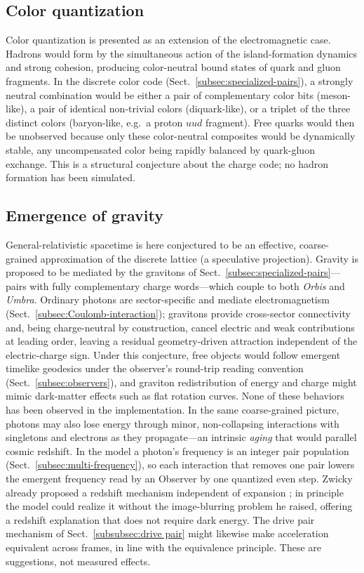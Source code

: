 \documentclass{ijuc}
\begin{document}
\subsection{Color quantization}
Color quantization is presented as an extension of the electromagnetic case.
Hadrons would form by the simultaneous action of the island-formation dynamics and strong cohesion, producing color-neutral bound states of quark and gluon fragments. In the discrete color code (Sect.~\ref{subsec:specialized-pairs}), a strongly neutral combination would be either a pair of complementary color bits (meson-like), a pair of identical non-trivial colors (diquark-like), or a triplet of the three distinct colors (baryon-like, e.g.\ a proton $uud$ fragment). Free quarks would then be unobserved because only these color-neutral composites would be dynamically stable, any uncompensated color being rapidly balanced by quark-gluon exchange. This is a structural conjecture about the charge code; no hadron formation has been simulated.
\subsection{Emergence of gravity}\label{subsec:emergence-of-gravity}
General-relativistic spacetime is here conjectured to be an effective, coarse-grained approximation of the discrete lattice (a speculative projection). Gravity is proposed to be mediated by the gravitons of Sect.~\ref{subsec:specialized-pairs}---pairs with fully complementary charge words---which couple to both \emph{Orbis} and \emph{Umbra}. Ordinary photons are sector-specific and mediate electromagnetism (Sect.~\ref{subsec:Coulomb-interaction}); gravitons provide cross-sector connectivity and, being charge-neutral by construction, cancel electric and weak contributions at leading order, leaving a residual geometry-driven attraction independent of the electric-charge sign. Under this conjecture, free objects would follow emergent timelike geodesics under the observer's round-trip reading convention (Sect.~\ref{subsec:observers}), and graviton redistribution of energy and charge might mimic dark-matter effects such as flat rotation curves. None of these behaviors has been observed in the implementation.
In the same coarse-grained picture, photons may also lose energy through minor, non-collapsing interactions with singletons and electrons as they propagate---an intrinsic \textit{aging} that would parallel cosmic redshift. In the model a photon's frequency is an integer pair population (Sect.~\ref{subsec:multi-frequency}), so each interaction that removes one pair lowers the emergent frequency read by an Observer by one quantized even step. Zwicky already proposed a redshift mechanism independent of expansion \cite{zwicky1929redshift}; in principle the model could realize it without the image-blurring problem he raised, offering a redshift explanation that does not require dark energy. The drive pair mechanism of Sect.~\ref{subsubsec:drive pair} might likewise make acceleration equivalent across frames, in line with the equivalence principle. These are suggestions, not measured effects.
\end{document}
